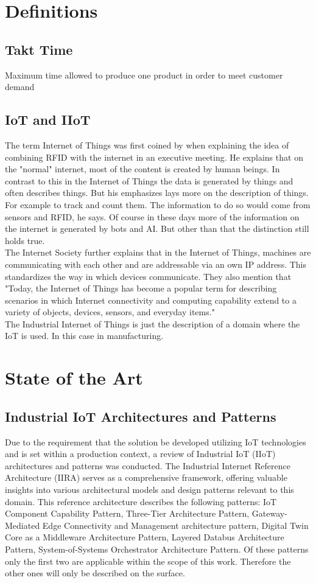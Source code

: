 \section{Definitions}
\subsection{Takt Time}
Maximum time allowed to produce one product in order to meet customer demand
\subsection{IoT and IIoT}
The term Internet of Things was first coined by \cite{ashtonThatInternetThings} when explaining the idea of combining RFID with the internet in an executive meeting. He explains that on the "normal" internet, most of the content is created by human beings. In contrast to this in the Internet of Things the data is generated by things and often describes things. But his emphasizes lays more on the description of things. For example to track and count them. The information to do so would come from sensors and RFID, he says.
Of course in these days more of the information on the internet is generated by bots and AI. But other than that the distinction still holds true. 
\\The Internet Society \cite{roseInternetThingsOverview} further explains that in the Internet of Things, machines are communicating with each other and are addressable via an own IP address. This standardizes the way in which devices communicate. They also mention that "Today, the Internet of Things has become a popular term for describing scenarios in which  Internet connectivity and computing capability extend to a variety of objects, devices, sensors, and everyday  items."
\\The Industrial Internet of Things is just the description of a domain where the IoT is used. In this case in manufacturing. \cite{WhatIoTInternet}
\section{State of the Art}\label{unterkapitel}
\subsection{Industrial IoT Architectures and Patterns}
Due to the requirement that the solution be developed utilizing IoT technologies and is set within a production context, a review of Industrial IoT (IIoT) architectures and patterns was conducted. The Industrial Internet Reference Architecture (IIRA) \cite{youngIndustrialInternetReference2022} serves as a comprehensive framework, offering valuable insights into various architectural models and design patterns relevant to this domain. This reference architecture describes the following patterns: IoT Component Capability Pattern, Three-Tier Architecture Pattern, Gateway-Mediated Edge Connectivity and Management architecture pattern, Digital Twin Core as a Middleware Architecture Pattern, Layered Databus Architecture Pattern, System-of-Systems Orchestrator Architecture Pattern. Of these patterns only the first two are applicable within the scope of this work. Therefore the other ones will only be described on the surface.
